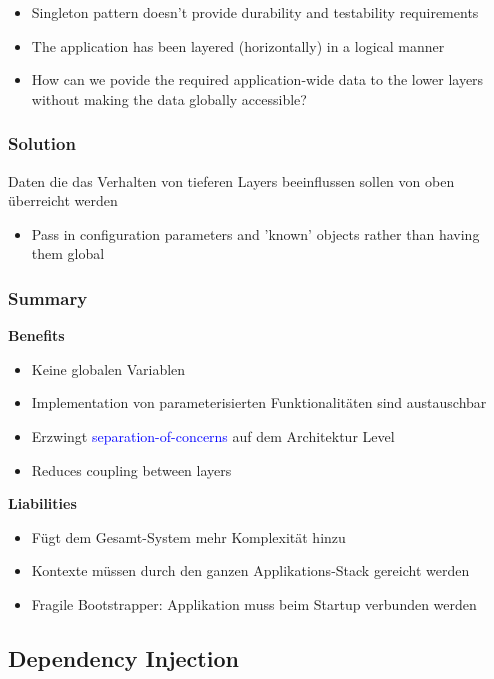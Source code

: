 \begin{itemize}
    \item Singleton pattern doesn't provide durability and testability requirements
    \item The application has been layered (horizontally) in a logical manner
    \item How can we povide the required application-wide data to the lower layers without making the data globally accessible?
\end{itemize}

\subsubsection{Solution}
Daten die das Verhalten von tieferen Layers beeinflussen sollen von oben überreicht werden

\begin{itemize}
    \item Pass in configuration parameters and 'known' objects rather than having them global
\end{itemize}
\subsubsection{Summary}
\textbf{Benefits}
\begin{itemize}
    \item Keine globalen Variablen
    \item Implementation von parameterisierten Funktionalitäten sind austauschbar
    \item Erzwingt \textcolor{blue}{separation-of-concerns} auf dem Architektur Level
    \item Reduces coupling between layers
\end{itemize}
\vspace{10pt}
\textbf{Liabilities}
\begin{itemize}
    \item Fügt dem Gesamt-System mehr Komplexität hinzu
    \item Kontexte müssen durch den ganzen Applikations-Stack gereicht werden
    \item Fragile Bootstrapper: Applikation muss beim Startup verbunden werden
\end{itemize}

\subsection{Dependency Injection}

